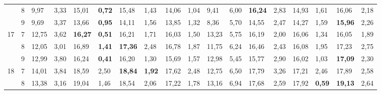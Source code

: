 \documentclass[conference]{IEEEtran}
\begin{document}
\begin{table}[]
\begin{tabular}{|cl|ll|ll|ll|ll|ll|ll|ll|ll|}
		\multicolumn{1}{|c|}{} & 8 & \multicolumn{1}{l|}{9,97} & 3,33 & \multicolumn{1}{l|}{15,01} & \textbf{0,72} & \multicolumn{1}{l|}{15,48} & 1,43 & \multicolumn{1}{l|}{14,06} & 1,04 & \multicolumn{1}{l|}{9,41} & 6,00 & \multicolumn{1}{l|}{\textbf{16,24}} & 2,83 & \multicolumn{1}{l|}{14,93} & 1,61 & \multicolumn{1}{l|}{16,06} & 2,18 \\ \cline{2-18} 
		\multicolumn{1}{|c|}{} & 9 & \multicolumn{1}{l|}{9,69} & 3,37 & \multicolumn{1}{l|}{13,66} & \textbf{0,95} & \multicolumn{1}{l|}{14,11} & 1,56 & \multicolumn{1}{l|}{13,85} & 1,32 & \multicolumn{1}{l|}{8,36} & 5,70 & \multicolumn{1}{l|}{14,55} & 2,47 & \multicolumn{1}{l|}{14,27} & 1,59 & \multicolumn{1}{l|}{\textbf{15,96}} & 2,26 \\ \hline
		\multicolumn{1}{|c|}{\multirow{3}{*}{17}} & 7 & \multicolumn{1}{l|}{12,75} & 3,62 & \multicolumn{1}{l|}{\textbf{16,27}} & \textbf{0,51} & \multicolumn{1}{l|}{16,21} & 1,71 & \multicolumn{1}{l|}{16,03} & 1,50 & \multicolumn{1}{l|}{13,23} & 5,75 & \multicolumn{1}{l|}{16,19} & 2,00 & \multicolumn{1}{l|}{16,06} & 1,34 & \multicolumn{1}{l|}{16,05} & 1,89 \\ \cline{2-18} 
		\multicolumn{1}{|c|}{} & 8 & \multicolumn{1}{l|}{12,05} & 3,01 & \multicolumn{1}{l|}{16,89} & \textbf{1,41} & \multicolumn{1}{l|}{\textbf{17,36}} & 2,48 & \multicolumn{1}{l|}{16,78} & 1,87 & \multicolumn{1}{l|}{11,75} & 6,24 & \multicolumn{1}{l|}{16,46} & 2,43 & \multicolumn{1}{l|}{16,08} & 1,95 & \multicolumn{1}{l|}{17,23} & 2,75 \\ \cline{2-18} 
		\multicolumn{1}{|c|}{} & 9 & \multicolumn{1}{l|}{12,99} & 3,80 & \multicolumn{1}{l|}{16,24} & \textbf{0,41} & \multicolumn{1}{l|}{16,20} & 1,30 & \multicolumn{1}{l|}{15,69} & 1,57 & \multicolumn{1}{l|}{12,98} & 5,45 & \multicolumn{1}{l|}{15,77} & 2,90 & \multicolumn{1}{l|}{16,02} & 1,03 & \multicolumn{1}{l|}{\textbf{17,09}} & 2,30 \\ \hline
		\multicolumn{1}{|c|}{\multirow{3}{*}{18}} & 7 & \multicolumn{1}{l|}{14,01} & 3,84 & \multicolumn{1}{l|}{18,59} & 2,50 & \multicolumn{1}{l|}{\textbf{18,84}} & \textbf{1,92} & \multicolumn{1}{l|}{17,62} & 2,48 & \multicolumn{1}{l|}{12,75} & 6,50 & \multicolumn{1}{l|}{17,79} & 3,26 & \multicolumn{1}{l|}{17,21} & 2,46 & \multicolumn{1}{l|}{17,89} & 2,58 \\ \cline{2-18} 
		\multicolumn{1}{|c|}{} & 8 & \multicolumn{1}{l|}{13,38} & 3,16 & \multicolumn{1}{l|}{19,04} & 1,46 & \multicolumn{1}{l|}{18,54} & 2,06 & \multicolumn{1}{l|}{17,22} & 1,78 & \multicolumn{1}{l|}{13,16} & 6,94 & \multicolumn{1}{l|}{17,68} & 2,59 & \multicolumn{1}{l|}{17,92} & \textbf{0,59} & \multicolumn{1}{l|}{\textbf{19,13}} & 2,64 \\ \cline{2-18} 

\end{tabular}
\end{table}
\end{document}
